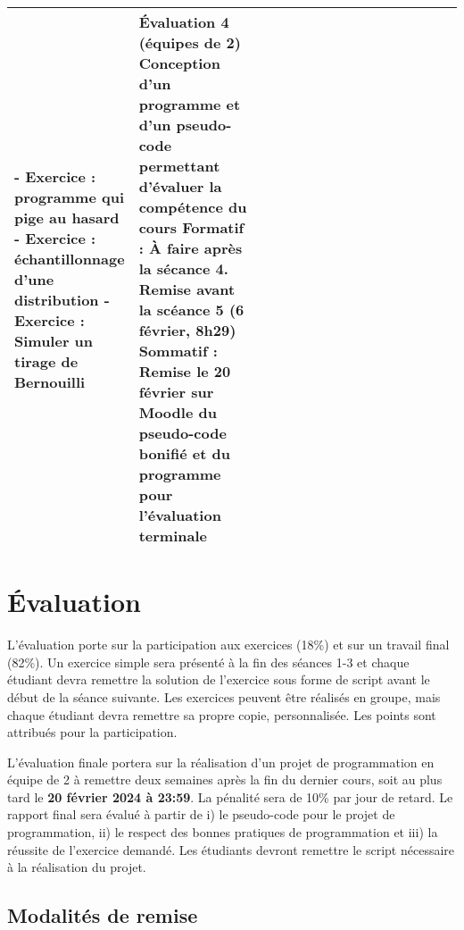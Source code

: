 \documentclass[12]{article}
\begin{document}
\begin{center}
\begin{tabular}{| p{0.1\linewidth} | p{0.3\linewidth} | p{0.3\linewidth} | p{0.3\linewidth} | }
        - Exercice : programme qui pige au hasard\hfill\hfill \linebreak
        - Exercice : échantillonnage d'une distribution\hfill\hfill \linebreak
        - Exercice : Simuler un tirage de Bernouilli\hfill\hfill &
        \textbf{Évaluation 4} (équipes de 2) \linebreak
        \textbf{Conception d'un programme et d'un pseudo-code permettant d’évaluer la compétence du cours}\hfill\hfill \linebreak\linebreak
        Formatif : À faire après la sécance 4. Remise avant la scéance 5 (6 février, 8h29)\hfill\hfill \linebreak\linebreak
        Sommatif : Remise le 20 février sur Moodle du pseudo-code bonifié et du programme pour l'évaluation terminale \hfill\hfill  \\
         \hline
         \hline
        \end{tabular}
        \end{center}

	\section*{Évaluation}

	L'évaluation porte sur la participation aux exercices (18\%) et sur un
	travail final (82\%). Un exercice simple sera présenté à la fin des
	séances 1-3 et chaque étudiant devra remettre la solution de l'exercice sous
	forme de script avant le début de la séance suivante. Les exercices
	peuvent être réalisés en groupe, mais chaque étudiant devra remettre sa
	propre copie, personnalisée. Les points sont attribués pour la
	participation.

	L'évaluation finale portera sur la réalisation d'un projet de
	programmation en équipe de 2 à remettre deux semaines après la fin du
	dernier cours, soit au plus tard le \textbf{20 février 2024 à 23:59}. La
	pénalité sera de 10\% par jour de retard. Le rapport final sera évalué à
	partir de i) le pseudo-code pour le projet de programmation, ii) le
	respect des bonnes pratiques de programmation et iii) la réussite de
	l'exercice demandé. Les étudiants devront remettre le script nécessaire à
	la réalisation du projet.

    \subsection*{Modalités de remise}
\end{document}
